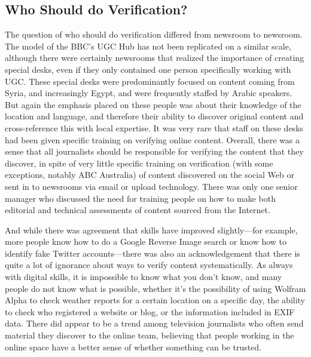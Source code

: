 \begin{enumerate}
\section{Who Should do Verification?}
The question of who should do verification differed from newsroom to
newsroom. The model of the BBC's UGC Hub has not been replicated
on a similar scale, although there were certainly newsrooms that realized
the importance of creating special desks, even if they only contained one
person specifically working with UGC. These special desks were predominantly
focused on content coming from Syria, and increasingly Egypt, and
were frequently staffed by Arabic speakers. But again the emphasis placed
on these people was about their knowledge of the location and language,
and therefore their ability to discover original content and cross-reference
this with local expertise. It was very rare that staff on these desks had been
given specific training on verifying online content.
Overall, there was a sense that all journalists should be responsible for verifying
the content that they discover, in spite of very little specific training
on verification (with some exceptions, notably ABC Australia) of content
discovered on the social Web or sent in to newsrooms via email or upload
technology. There was only one senior manager who discussed the need for
training people on how to make both editorial and technical assessments of
content sourced from the Internet.

And while there was agreement that skills have improved slightly—for
example, more people know how to do a Google Reverse Image search or
know how to identify fake Twitter accounts—there was also an acknowledgement
that there is quite a lot of ignorance about ways to verify content
systematically. As always with digital skills, it is impossible to know what
you don't know, and many people do not know what is possible, whether it's
the possibility of using Wolfram Alpha to check weather reports for a certain
location on a specific day, the ability to check who registered a website
or blog, or the information included in EXIF data. There did appear to be
a trend among television journalists who often send material they discover
to the online team, believing that people working in the online space have a
better sense of whether something can be trusted.

\end{enumerate}
